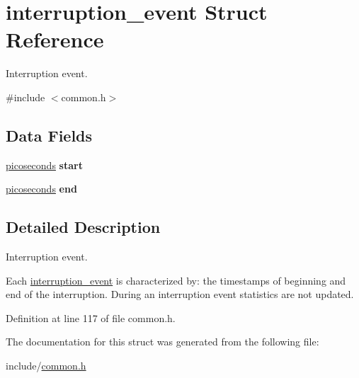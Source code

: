 \hypertarget{structinterruption__event}{}\section{interruption\+\_\+event Struct Reference}
\label{structinterruption__event}


Interruption event.  




{\ttfamily \#include $<$common.\+h$>$}

\subsection*{Data Fields}
\begin{DoxyCompactItemize}
\item 
\mbox{\label{structinterruption__event_a64b516cf84f0a790ca2fb38b751fce0f}} 
\mbox{\hyperlink{common_8h_aa141e5aeed9e5c126c44e1e0ca46a917}{picoseconds}} {\bfseries start}
\item 
\mbox{\label{structinterruption__event_abcb94fe0e71e1001d83ed2cfe80e8b50}} 
\mbox{\hyperlink{common_8h_aa141e5aeed9e5c126c44e1e0ca46a917}{picoseconds}} {\bfseries end}
\end{DoxyCompactItemize}


\subsection{Detailed Description}
Interruption event. 

Each \mbox{\hyperlink{structinterruption__event}{interruption\+\_\+event}} is characterized by\+: the timestamps of beginning and end of the interruption. During an interruption event statistics are not updated. 

Definition at line 117 of file common.\+h.



The documentation for this struct was generated from the following file\+:\begin{DoxyCompactItemize}
\item 
include/\mbox{\hyperlink{common_8h}{common.\+h}}\end{DoxyCompactItemize}
